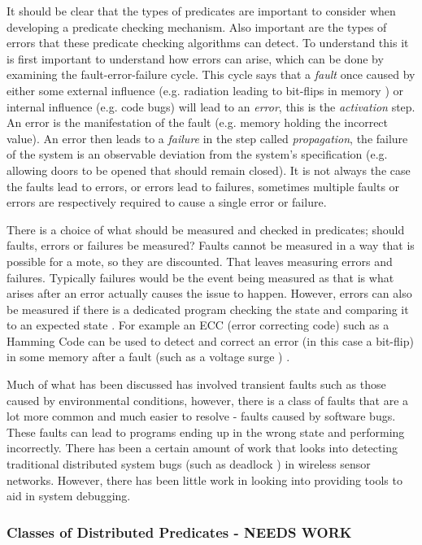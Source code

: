 It should be clear that the types of predicates are important to consider when developing a predicate checking mechanism. Also important are the types of errors that these predicate checking algorithms can detect. To understand this it is first important to understand how errors can arise, which can be done by examining the fault-error-failure cycle. This cycle says that a \emph{fault} once caused by either some external influence (e.g. radiation leading to bit-flips in memory \cite{1017791}) or internal influence (e.g. code bugs) will lead to an \emph{error}, this is the \emph{activation} step. An error is the manifestation of the fault (e.g. memory holding the incorrect value). An error then leads to a \emph{failure} in the step called \emph{propagation}, the failure of the system is an observable deviation from the system's specification (e.g. allowing doors to be opened that should remain closed). It is not always the case the faults lead to errors, or errors lead to failures, sometimes multiple faults or errors are respectively required to cause a single error or failure. \cite{1335465}

There is a choice of what should be measured and checked in predicates; should faults, errors or failures be measured? Faults cannot be measured \cite{?} in a way that is possible for a mote, so they are discounted. That leaves measuring errors and failures. Typically failures would be the event being measured \cite{?} as that is what arises after an error actually causes the issue to happen. However, errors can also be measured if there is a dedicated program checking the state and comparing it to an expected state \cite{?}. For example an ECC (error correcting code) such as a Hamming Code can be used to detect and correct an error (in this case a bit-flip) in some memory after a fault (such as a voltage surge ) \cite{hamming1950error}.

Much of what has been discussed has involved transient faults such as those caused by environmental conditions, however, there is a class of faults that are a lot more common and much easier to resolve - faults caused by software bugs. These faults can lead to programs ending up in the wrong state and performing incorrectly. There has been a certain amount of work that looks into detecting traditional distributed system bugs (such as deadlock \cite{5587352,5284172}) in wireless sensor networks. However, there has been little work in looking into providing tools to aid in system debugging.

\subsubsection*{Classes of Distributed Predicates - NEEDS WORK}

